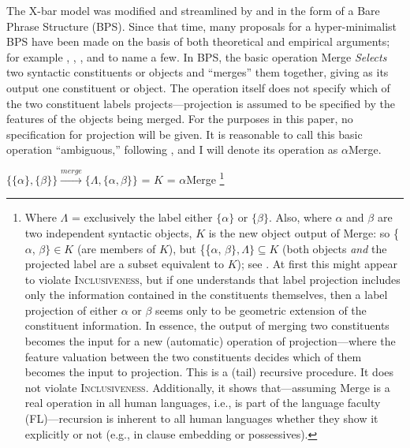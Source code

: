 \documentclass[11pt,twoside]{article}
\begin{document}
The X-bar model was modified and streamlined by \cite{chomsky94bps} and \cite{chomsky95bps} in the form of a Bare Phrase Structure (BPS). Since that time, many proposals for a hyper-minimalist BPS have been made on the basis of both theoretical and empirical arguments; for example \cite{carnie:2000}, \cite{citko:2005}, \cite{collins:2001}, and \cite{jayaseelan:2008} to name a few. In BPS, the basic operation Merge \textsl{Selects} two syntactic constituents or objects and ``merges'' them together, giving as its output one constituent or object. The operation itself does not specify which of the two constituent labels projects---projection is assumed to be specified by the features of the objects being merged. For the purposes in this paper, no specification for projection will be given. It is reasonable to call this basic operation ``ambiguous,'' following \cite{boeckx08bare}, and I will denote its operation as $\alpha$Merge. 


\begin{definition}
$\{\{\alpha\}, \{\beta\}\} \stackrel{merge}{\longrightarrow} \{\Lambda, \{\alpha, \beta\}\}$ = $K$ = $\alpha$Merge \label{amerge}
\footnote{Where $\Lambda$ = exclusively the label either $\{\alpha\}$ or $\{\beta\}$. Also, where $\alpha$ and $\beta$ are two independent syntactic objects, $K$ is the new object output of Merge: so \{$\alpha$, $\beta\} \in K$ (are members of $K$), but \{\{$\alpha$, $\beta\}, \Lambda\} \subseteq K$ (both objects \textsl{and} the projected label are a subset equivalent to $K$); see \cite{chomsky95mp}. At first this might appear to violate \textsc{Inclusiveness}, but if one understands that label projection includes only the information contained in the constituents themselves, then a label projection of either $\alpha$ or $\beta$ seems only to be geometric extension of the constituent information. In essence, the output of merging two constituents becomes the input for a new (automatic) operation of projection---where the feature valuation between the two constituents decides which of them becomes the input to projection. This is a (tail) recursive procedure. It does not violate \textsc{Inclusiveness}. Additionally, it shows that---assuming Merge is a real operation in all human languages, i.e., is part of the language faculty (FL)---recursion is inherent to all human languages whether they show it explicitly or not (e.g., in clause embedding or possessives).}
\end{definition} 
\end{document}
